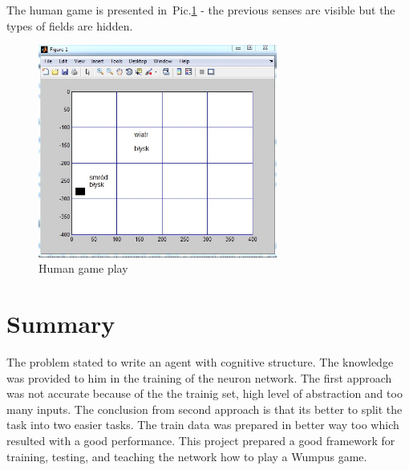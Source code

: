 \documentclass[a4paper]{article}
\begin{document}

The human game is presented in~Pic.\ref{pic:humanGame} - the previous senses are visible but the types of fields are hidden.

\begin{figure}[!h]
		\centering	
		\includegraphics[width=0.7\textwidth]{pic/humanGame.jpg}
		\caption{Human game play}
		\label{pic:humanGame}
	\end{figure}

\section{Summary}

	The problem stated to write an agent with cognitive structure. The knowledge was provided to him in the training of the neuron network. The first approach was not accurate because of the the trainig set, high level of abstraction and too many inputs. The conclusion from second approach is that its better to split the task into two easier tasks. The train data was prepared in better way too which resulted with a good performance. 
This project prepared a good framework for training, testing, and teaching the network how to play a Wumpus game.
\end{document}
